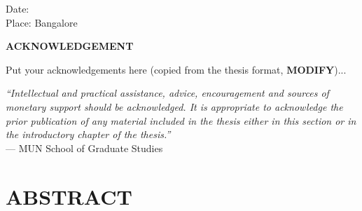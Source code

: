 \documentclass[english,a4paper,11pt]{report}
\newcommand{\precursortitle}[1]{
	\begin{center}
		\textbf{\Large #1}
	\end{center}
}
\begin{document}
	\vspace*{2cm}
	\noindent Date: \\
	\noindent Place: Bangalore \\
	
	\afterpage{\null\newpage}
	
	\newpage
	\setcounter{page}{4}
	\thispagestyle{plain}
	
	\precursortitle{\MakeUppercase{Acknowledgement}}
	\vspace{1cm}
	
	Put your acknowledgements here (copied from the thesis format, \textbf{MODIFY})...
	\vspace{1cm}
	
	\noindent\emph{``Intellectual and practical assistance, advice, encouragement and
		sources of monetary support should be acknowledged. It is appropriate to
		acknowledge the prior publication of any material included in the thesis
		either in this section or in the introductory chapter of the thesis.''}\\
	
	\hfill --- MUN School of Graduate Studies
	\clearpage
	
	\newpage
	
	\thispagestyle{plain}

	\tableofcontents
	\clearpage
	
	\newpage
	\listoftables
	
	\newpage
	\listoffigures
	
	\newpage
	\chapter*{\MakeUppercase{Abstract}}
	
\end{document}
